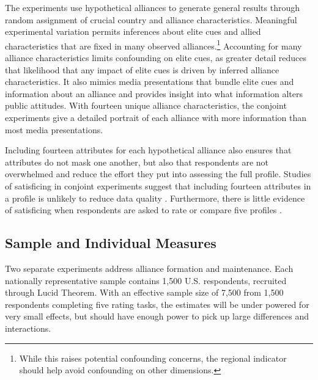 \documentclass[12pt]{article}
\begin{document}
The experiments use hypothetical alliances to generate general results through random assignment of crucial country and alliance characteristics. 
Meaningful experimental variation permits inferences about elite cues and allied characteristics that are fixed in many observed alliances.\footnote{While this raises potential confounding concerns, the regional indicator should help avoid confounding on other dimensions.}
Accounting for many alliance characteristics limits confounding on elite cues, as greater detail reduces that likelihood that any impact of elite cues is driven by inferred alliance characteristics.
It also mimics media presentations that bundle elite cues and information about an alliance and provides insight into what information alters public attitudes. 
With fourteen unique alliance characteristics, the conjoint experiments give a detailed portrait of each alliance with more information than most media presentations.


Including fourteen attributes for each hypothetical alliance also ensures that attributes do not mask one another, but also that respondents are not overwhelmed and reduce the effort they put into assessing the full profile.
Studies of satisficing in conjoint experiments suggest that including fourteen attributes in a profile is unlikely to reduce data quality \citep{Bansaketal2019}. 
Furthermore, there is little evidence of satisficing when respondents are asked to rate or compare five profiles \citep{Bansaketal2018}.



\subsection{Sample and Individual Measures}


Two separate experiments address alliance formation and maintenance. 
Each nationally representative sample contains 1,500 U.S. respondents, recruited through Lucid Theorem.
With an effective sample size of 7,500 from 1,500 respondents completing five rating tasks, the estimates will be under powered for very small effects, but should have enough power to pick up large differences and interactions. 
\end{document}
